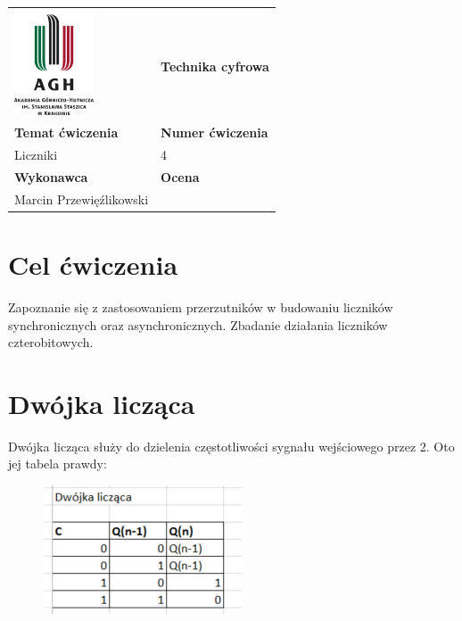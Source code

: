 \documentclass[12pt,a4paper]{article}
\begin{document}
\begin{table}[]
\label{my-label}
\begin{tabular}{|p{7.5cm}|p{7.5cm}|}
\hline
									           					&                           \\
\includegraphics[height=3cm]{logo}             					& \textbf{Technika cyfrowa} \\ \hline
\multicolumn{1}{|l|}{\textbf{Temat ćwiczenia}} 					& \textbf{Numer ćwiczenia}  \\
\multicolumn{1}{|l|}{Liczniki}	& 4                         \\ \hline
\multicolumn{1}{|l|}{\textbf{Wykonawca}}       & \textbf{Ocena}            \\
\multicolumn{1}{|l|}{Marcin Przewięźlikowski}          &                           \\ \hline
\end{tabular}
\end{table}

\section{Cel ćwiczenia}

Zapoznanie się z zastosowaniem przerzutników w budowaniu liczników synchronicznych oraz asynchronicznych. Zbadanie działania liczników czterobitowych.

\section{Dwójka licząca}



Dwójka licząca służy do dzielenia częstotliwości sygnału wejściowego przez 2. Oto jej tabela prawdy:



\begin{figure}[H]
\centering
\includegraphics{img/4a_table}
\end{figure}
\end{document}
